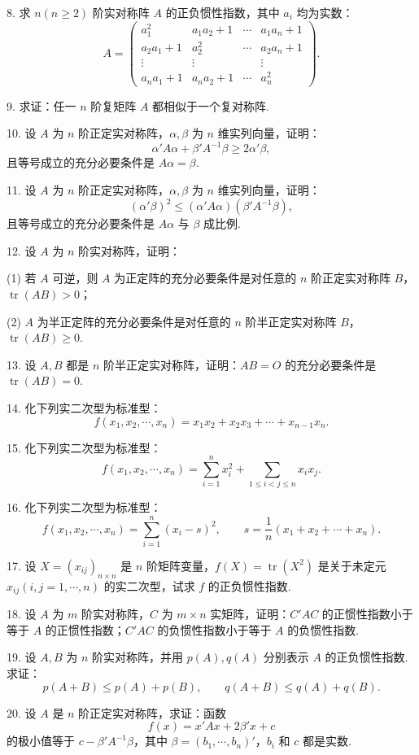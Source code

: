 \documentclass[UTF8,12pt,a4paper,fontset=fandol]{ctexart}
\begin{document}
8. 求 $n(n\geq 2)$ 阶实对称阵 $A$ 的正负惯性指数，其中 $a_i$ 均为实数：
\[
A=\left(\begin{array}{cccc}
a_1^2&a_1a_2+1&\cdots&a_1a_n+1\\
a_2a_1+1&a_2^2&\cdots&a_2a_n+1\\
\vdots&\vdots&&\vdots\\
a_na_1+1&a_na_2+1&\cdots&a_n^2
\end{array}\right).
\]

9. 求证：任一 $n$ 阶复矩阵 $A$ 都相似于一个复对称阵.

10. 设 $A$ 为 $n$ 阶正定实对称阵，$\alpha,\beta$ 为 $n$ 维实列向量，证明：
\[
\alpha'A\alpha+\beta'A^{-1}\beta\geq 2\alpha'\beta,
\]
且等号成立的充分必要条件是 $A\alpha=\beta$.

11. 设 $A$ 为 $n$ 阶正定实对称阵，$\alpha,\beta$ 为 $n$ 维实列向量，证明：
\[
(\alpha'\beta)^2\leq(\alpha'A\alpha)(\beta'A^{-1}\beta),
\]
且等号成立的充分必要条件是 $A\alpha$ 与 $\beta$ 成比例.

12. 设 $A$ 为 $n$ 阶实对称阵，证明：

(1) 若 $A$ 可逆，则 $A$ 为正定阵的充分必要条件是对任意的 $n$ 阶正定实对称阵 $B$，$\operatorname{tr}(AB)>0$；

(2) $A$ 为半正定阵的充分必要条件是对任意的 $n$ 阶半正定实对称阵 $B$，$\operatorname{tr}(AB)\geq 0$.

13. 设 $A,B$ 都是 $n$ 阶半正定实对称阵，证明：$AB=O$ 的充分必要条件是 $\operatorname{tr}(AB)=0$.

14. 化下列实二次型为标准型：
\[
f(x_1,x_2,\cdots,x_n)=x_1x_2+x_2x_3+\cdots+x_{n-1}x_n.
\]

15. 化下列实二次型为标准型：
\[
f(x_1,x_2,\cdots,x_n)=\sum_{i=1}^n x_i^2+\sum_{1\leq i<j\leq n}x_ix_j.
\]

16. 化下列实二次型为标准型：
\[
f(x_1,x_2,\cdots,x_n)=\sum_{i=1}^n(x_i-s)^2,\qquad s=\frac1n(x_1+x_2+\cdots+x_n).
\]

17. 设 $X=(x_{ij})_{n\times n}$ 是 $n$ 阶矩阵变量，$f(X)=\operatorname{tr}(X^2)$ 是关于未定元 $x_{ij}(i,j=1,\cdots,n)$ 的实二次型，试求 $f$ 的正负惯性指数.

18. 设 $A$ 为 $m$ 阶实对称阵，$C$ 为 $m\times n$ 实矩阵，证明：$C'AC$ 的正惯性指数小于等于 $A$ 的正惯性指数；$C'AC$ 的负惯性指数小于等于 $A$ 的负惯性指数.

19. 设 $A,B$ 为 $n$ 阶实对称阵，并用 $p(A),q(A)$ 分别表示 $A$ 的正负惯性指数. 求证：
\[
p(A+B)\leq p(A)+p(B),\qquad q(A+B)\leq q(A)+q(B).
\]

20. 设 $A$ 是 $n$ 阶正定实对称阵，求证：函数
\[
f(x)=x'Ax+2\beta'x+c
\]
的极小值等于 $c-\beta'A^{-1}\beta$，其中 $\beta=(b_1,\cdots,b_n)'$，$b_i$ 和 $c$ 都是实数.
\end{document}
